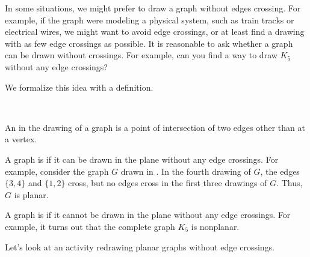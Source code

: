 In some situations, we might prefer to draw a graph without edges crossing. For example, if the graph were modeling a physical system, such as train tracks or electrical wires, we might want to avoid edge crossings, or at least find a drawing with as few edge crossings as possible.  It is reasonable to ask whether a graph can be drawn without crossings.  For example, can you find a way to draw $K_5$ without any edge crossings?

We formalize this idea with a definition.

\begin{defn}
\label{defn_planar}
~
    \begin{apart}
        \item An  in the drawing of a graph is a point of intersection of two edges other than at a vertex.
        \item A graph is  if it can be drawn in the plane without any edge crossings.  For example, consider the graph $G$ drawn in .  In the fourth drawing of $G$, the edges $\{3,4\}$ and $\{1,2\}$ cross, but no edges cross in the first three drawings of $G$. Thus, $G$ is planar.
        \item A graph is  if it cannot be drawn in the plane without any edge crossings.  For example, it turns out that the complete graph $K_5$ is nonplanar.
        \end{apart}
    \end{defn}

Let's look at an activity redrawing planar graphs without edge crossings.  

